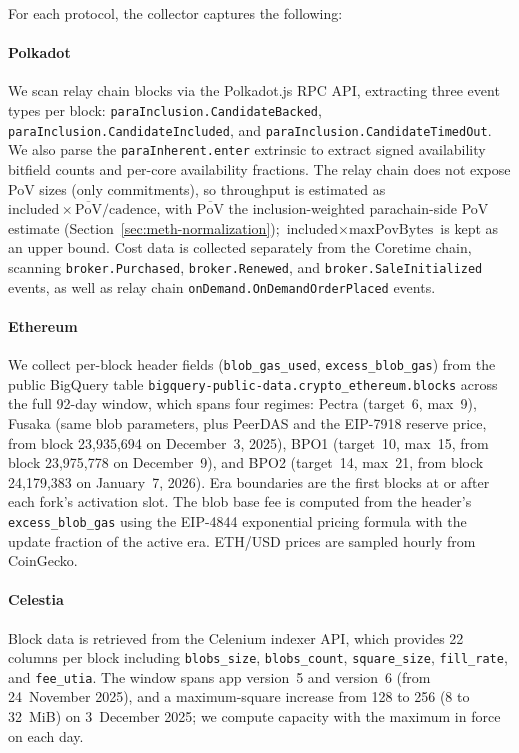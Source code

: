 For each protocol, the collector captures the following:

\paragraph{Polkadot}
We scan relay chain blocks via the Polkadot.js RPC API, extracting three event types per block: \texttt{paraInclusion.CandidateBacked}, \texttt{paraInclusion.CandidateIncluded}, and \texttt{paraInclusion.CandidateTimedOut}.
We also parse the \texttt{paraInherent.enter} extrinsic to extract signed availability bitfield counts and per-core availability fractions.
The relay chain does not expose PoV sizes (only commitments), so throughput is estimated as $\text{included} \times \overline{\text{PoV}} / \text{cadence}$, with $\overline{\text{PoV}}$ the inclusion-weighted parachain-side PoV estimate (Section~\ref{sec:meth-normalization}); $\text{included} \times \text{maxPovBytes}$ is kept as an upper bound.
Cost data is collected separately from the Coretime chain, scanning \texttt{broker.Purchased}, \texttt{broker.Renewed}, and \texttt{broker.SaleInitialized} events, as well as relay chain \texttt{onDemand.OnDemandOrderPlaced} events.

\paragraph{Ethereum}
We collect per-block header fields (\texttt{blob\_gas\_used}, \texttt{excess\_blob\_gas}) from the public BigQuery table \texttt{bigquery-public-data.crypto\_ethereum.blocks} across the full 92-day window, which spans four regimes: Pectra (target~6, max~9), Fusaka (same blob parameters, plus PeerDAS and the EIP-7918 reserve price, from block 23{,}935{,}694 on December~3, 2025), BPO1 (target~10, max~15, from block 23{,}975{,}778 on December~9), and BPO2 (target~14, max~21, from block 24{,}179{,}383 on January~7, 2026). Era boundaries are the first blocks at or after each fork's activation slot.
The blob base fee is computed from the header's \texttt{excess\_blob\_gas} using the EIP-4844 exponential pricing formula with the update fraction of the active era.
ETH/USD prices are sampled hourly from CoinGecko.

\paragraph{Celestia}
Block data is retrieved from the Celenium indexer API, which provides 22 columns per block including \texttt{blobs\_size}, \texttt{blobs\_count}, \texttt{square\_size}, \texttt{fill\_rate}, and \texttt{fee\_utia}.
The window spans app version~5 and version~6 (from 24~November 2025), and a maximum-square increase from 128 to 256 (8 to 32~MiB) on 3~December 2025; we compute capacity with the maximum in force on each day.

